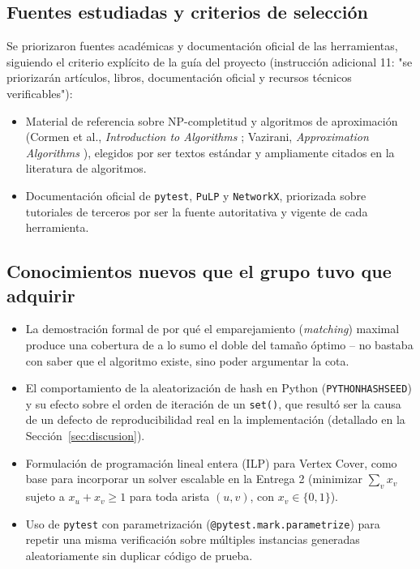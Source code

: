 \documentclass[11pt,a4paper]{article}
\begin{document}
\subsection{Fuentes estudiadas y criterios de selección}
Se priorizaron fuentes académicas y documentación oficial de las herramientas, siguiendo el
criterio explícito de la guía del proyecto (instrucción adicional 11: "se priorizarán
artículos, libros, documentación oficial y recursos técnicos verificables"):
\begin{itemize}
	\item Material de referencia sobre NP-completitud y algoritmos de aproximación
	(Cormen et al., \emph{Introduction to Algorithms} \cite{clrs2009}; Vazirani,
	\emph{Approximation Algorithms} \cite{vazirani2003}), elegidos por ser textos
	estándar y ampliamente citados en la literatura de algoritmos.
	\item Documentación oficial de \texttt{pytest}, \texttt{PuLP} y \texttt{NetworkX},
	priorizada sobre tutoriales de terceros por ser la fuente autoritativa y vigente de
	cada herramienta.
\end{itemize}

\subsection{Conocimientos nuevos que el grupo tuvo que adquirir}
\begin{itemize}
	\item La demostración formal de por qué el emparejamiento (\emph{matching}) maximal
	produce una cobertura de a lo sumo el doble del tamaño óptimo -- no bastaba con saber
	que el algoritmo existe, sino poder argumentar la cota.
	\item El comportamiento de la aleatorización de hash en Python (\texttt{PYTHONHASHSEED})
	y su efecto sobre el orden de iteración de un \texttt{set()}, que resultó ser la causa
	de un defecto de reproducibilidad real en la implementación (detallado en la
	Sección~\ref{sec:discusion}).
	\item Formulación de programación lineal entera (ILP) para Vertex Cover, como base para
	incorporar un solver escalable en la Entrega 2 (minimizar $\sum_v x_v$ sujeto a
	$x_u + x_v \geq 1$ para toda arista $(u,v)$, con $x_v \in \{0,1\}$).
	\item Uso de \texttt{pytest} con parametrización (\texttt{@pytest.mark.parametrize}) para
	repetir una misma verificación sobre múltiples instancias generadas aleatoriamente sin
	duplicar código de prueba.
\end{itemize}
\end{document}
